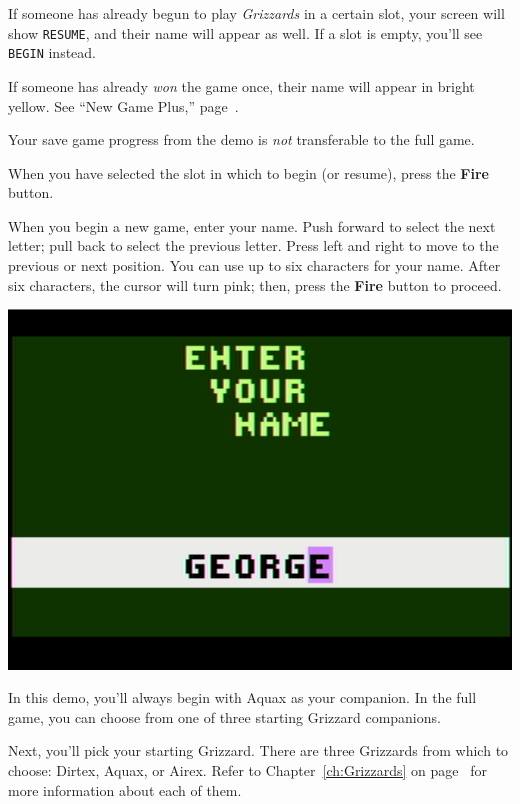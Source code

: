 \documentclass[9pt,twocolumn,openany,article]{memoir}
\begin{document}
If someone  has already  begun to play  \textit{Grizzards} in  a certain
slot, your screen will show  \texttt{RESUME}, and their name will appear
as well. If a slot is empty, you'll see \texttt{BEGIN} instead.

If someone has already \emph{won} the  game once, their name will appear
in bright yellow. See ``New Game Plus,'' page~\pageref{sec:NewGamePlus}.

\ifdefined\DEMO

\skip

Your save game progress from the demo is \emph{not} transferable to the
full game.

\skip

\fi

When you have selected the slot in which to begin (or resume), press the
\textbf{Fire} button.

\fi

\ifdefined\NOSAVE\else

When you begin a  new game, enter your name. Push  forward to select the
next letter;  pull back to  select the  previous letter. Press  left and
right to move to  the previous or next position. You can  use up to six
characters for  your name.  After six characters,  the cursor  will turn
pink; then, press the \textbf{Fire} button to proceed.

\begin{center}
  \includegraphics[width=.75\columnwidth]{../Manual/NameEntryNTSC.png}
\end{center}

\ifdefined\DEMO

In this demo,  you'll always begin with Aquax as  your companion. In the
full game, you can choose from one of three starting Grizzard companions.

\else

Next, you'll pick your starting Grizzard. There are three Grizzards from
which    to    choose:   Dirtex,    Aquax,    or    Airex.   Refer    to
Chapter~\ref{ch:Grizzards}   on  page~\pageref{ch:Grizzards}   for  more
information about each of them.
\end{document}
